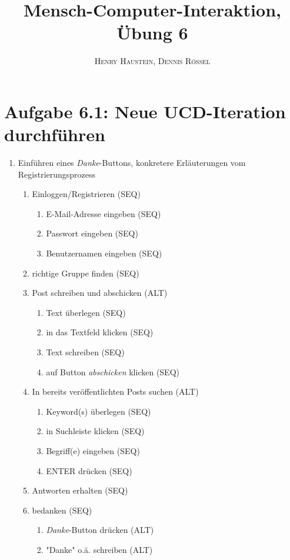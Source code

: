 \documentclass{article}
\title{\textbf{Mensch-Computer-Interaktion, Übung 6}}
\author{\textsc{Henry Haustein}, \textsc{Dennis Rössel}}
\date{}
\begin{document}
	\maketitle
	
	\section*{Aufgabe 6.1: Neue UCD-Iteration durchführen}
	\begin{enumerate}[label=(\alph*)]
		\item Einführen eines \textit{Danke}-Buttons, konkretere Erläuterungen vom Registrierungsprozess
		\begin{enumerate}[label=\arabic*.]
			\item Einloggen/Registrieren (SEQ)
			\begin{enumerate}
				\item E-Mail-Adresse eingeben (SEQ)
				\item Passwort eingeben (SEQ)
				\item Benutzernamen eingeben (SEQ)
			\end{enumerate}
			\item richtige Gruppe finden (SEQ)
			\item Post schreiben und abschicken (ALT)
			\begin{enumerate}
				\item Text überlegen (SEQ)
				\item in das Textfeld klicken (SEQ)
				\item Text schreiben (SEQ)
				\item auf Button \textit{abschicken} klicken (SEQ)
			\end{enumerate}
			\item In bereits veröffentlichten Posts suchen (ALT)
			\begin{enumerate}
				\item Keyword(s) überlegen (SEQ)
				\item in Suchleiste klicken (SEQ)
				\item Begriff(e) eingeben (SEQ)
				\item ENTER drücken (SEQ)
			\end{enumerate}
			\item Antworten erhalten (SEQ)
			\item bedanken (SEQ)
			\begin{enumerate}
				\item \textit{Danke}-Button drücken (ALT)
				\item "Danke" o.ä. schreiben (ALT)

\end{enumerate}
\end{enumerate}
\end{enumerate}
\end{document}
